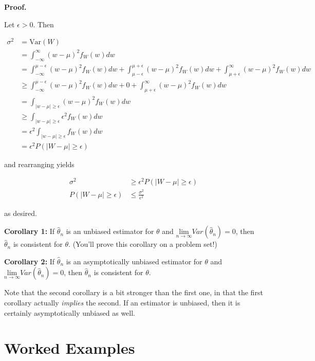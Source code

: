 \documentclass[
  letterpaper,
  DIV=11,
  numbers=noendperiod]{scrreprt}
\begin{document}
\textbf{Proof.}

Let \(\epsilon > 0\). Then

\begin{align*}
\sigma^2 & = \text{Var}(W) \\
& = \int_{-\infty}^\infty (w-\mu)^2 f_W(w)dw \\
& = \int_{-\infty}^{\mu - \epsilon} (w-\mu)^2 f_W(w)dw + \int_{\mu - \epsilon}^{\mu + \epsilon} (w-\mu)^2 f_W(w)dw + \int_{\mu + \epsilon}^\infty (w-\mu)^2 f_W(w)dw \\
& \ge \int_{-\infty}^{\mu - \epsilon} (w-\mu)^2 f_W(w)dw + 0  + \int_{\mu + \epsilon}^\infty (w-\mu)^2 f_W(w)dw \\
&= \int_{|w-\mu|\ge \epsilon} (w-\mu)^2 f_W(w)dw \\
& \ge \int_{|w-\mu|\ge \epsilon} \epsilon^2 f_W(w)dw \\
& = \epsilon^2 \int_{|w-\mu|\ge \epsilon} f_W(w)dw\\
& = \epsilon^2 P(|W-\mu| \ge \epsilon)
\end{align*}

and rearranging yields

\begin{align*}
\sigma^2 & \geq \epsilon^2 P(|W-\mu| \ge \epsilon) \\
P(|W-\mu| \geq \epsilon) & \leq \frac{\sigma^2}{\epsilon^2}
\end{align*}

as desired.

\textbf{Corollary 1:} If \(\hat{\theta}_n\) is an unbiased estimator for
\(\theta\) and
\(\underset{n \to \infty}{\text{lim}} Var(\hat{\theta}_n) = 0\), then
\(\hat{\theta}_n\) is consistent for \(\theta\). (You'll prove this
corollary on a problem set!)

\textbf{Corollary 2:} If \(\hat{\theta}_n\) is an asymptotically
unbiased estimator for \(\theta\) and
\(\underset{n \to \infty}{\text{lim}} Var(\hat{\theta}_n) = 0\), then
\(\hat{\theta}_n\) is consistent for \(\theta\).

Note that the second corollary is a bit stronger than the first one, in
that the first corollary actually \emph{implies} the second. If an
estimator is unbiased, then it is certainly asymptotically unbiased as
well.

\section{Worked Examples}\label{worked-examples-4}
\end{document}

